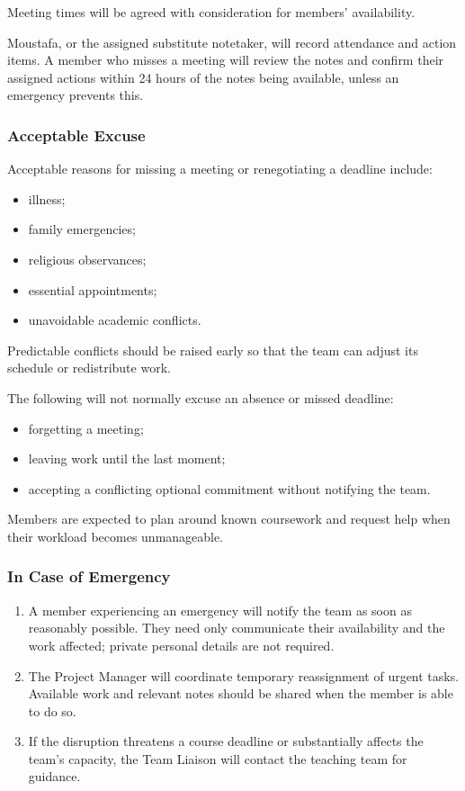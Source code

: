 \documentclass{article}
\begin{document}
Meeting times will be agreed with consideration for members'
availability.

Moustafa, or the assigned substitute notetaker, will record
attendance and action items. A member who misses a meeting will
review the notes and confirm their assigned actions within
24 hours of the notes being available, unless an emergency
prevents this.

\subsubsection*{Acceptable Excuse}

Acceptable reasons for missing a meeting or renegotiating a deadline
include:

\begin{itemize}
    \item illness;
    \item family emergencies;
    \item religious observances;
    \item essential appointments;
    \item unavoidable academic conflicts.
\end{itemize}

Predictable conflicts should be raised early so that the team can adjust
its schedule or redistribute work.

The following will not normally excuse an absence or missed deadline:

\begin{itemize}
    \item forgetting a meeting;
    \item leaving work until the last moment;
    \item accepting a conflicting optional commitment without notifying
    the team.
\end{itemize}

Members are expected to plan around known coursework and request help
when their workload becomes unmanageable.

\subsubsection*{In Case of Emergency}

\begin{enumerate}
    \item A member experiencing an emergency will notify the team as soon
    as reasonably possible. They need only communicate their availability
    and the work affected; private personal details are not required.
    \item The Project Manager will coordinate temporary reassignment of
    urgent tasks. Available work and relevant notes should be shared when
    the member is able to do so.
    \item If the disruption threatens a course deadline or substantially
    affects the team's capacity, the Team Liaison will contact the teaching
    team for guidance.
\end{enumerate}
\end{document}

